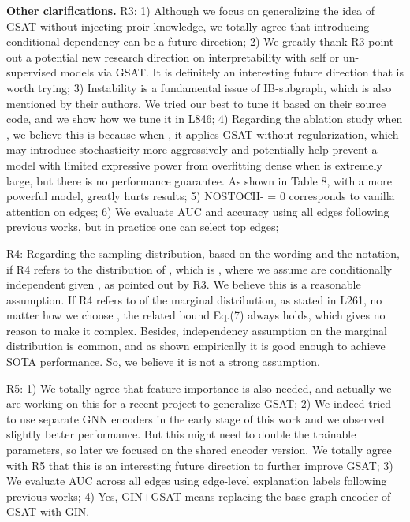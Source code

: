 \documentclass{article}
\begin{document}
\textbf{Other clarifications.} 
R3: 1) Although we focus on generalizing the idea of GSAT without injecting proir knowledge, we totally agree that introducing conditional dependency can be a future direction;
2) We greatly thank R3 point out a potential new research direction on interpretability with self or un-supervised models via GSAT. It is definitely an interesting future direction that is worth trying; 
3) Instability is a fundamental issue of IB-subgraph, which is also mentioned by their authors. We tried our best to tune it based on their source code, and we show how we tune it in L846;
4) Regarding the ablation study when , we believe this is because when , it applies GSAT without regularization, which may introduce stochasticity more aggressively and potentially help prevent a model with limited expressive power from overfitting dense  when  is extremely large, but there is no performance guarantee. As shown in Table 8, with a more powerful model,  greatly hurts results;
5) NOSTOCH- = 0 corresponds to vanilla attention on edges;
6) We evaluate AUC and accuracy using all edges following previous works, but in practice one can select top edges;

R4: Regarding the sampling distribution, based on the wording and the notation, if R4 refers to the distribution of , which is , where we assume  are conditionally independent given , as pointed out by R3. We believe this is a reasonable assumption. If R4 refers to  of the marginal distribution, as stated in L261, no matter how we choose , the related bound Eq.(7) always holds, which gives no reason to make it complex. Besides, independency assumption on the marginal distribution is common, and as shown empirically it is good enough to achieve SOTA performance. So, we believe it is not a strong assumption.

R5: 1) We totally agree that feature importance is also needed, and actually we are working on this for a recent project to generalize GSAT;
2) We indeed tried to use separate GNN encoders in the early stage of this work and we observed slightly better performance. But this might need to double the trainable parameters, so later we focused on the shared encoder version. We totally agree with R5 that this is an interesting future direction to further improve GSAT;
3) We evaluate AUC across all edges using edge-level explanation labels following previous works;
4) Yes, GIN+GSAT means replacing the base graph encoder of GSAT with GIN.
\end{document}
